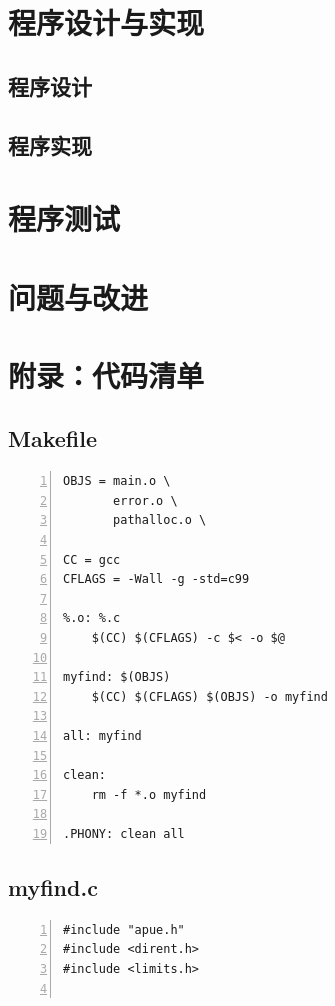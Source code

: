 \documentclass[a4paper,twoside]{article}
\begin{document}
\begin{spacing}{1.2}
\section{程序设计与实现}

\subsection{程序设计}

\subsection{程序实现}

\section{程序测试}

\section{问题与改进}

\appendix
\clearpage
\section*{附录：代码清单}
\label{sec:code}

\subsection{Makefile}

\begin{lstlisting}[numbers=left,style=MakefileStyle,caption=Makefile,label={code:makefile}]
OBJS = main.o \
	   error.o \
	   pathalloc.o \

CC = gcc
CFLAGS = -Wall -g -std=c99

%.o: %.c
	$(CC) $(CFLAGS) -c $< -o $@

myfind: $(OBJS)
	$(CC) $(CFLAGS) $(OBJS) -o myfind

all: myfind

clean:
	rm -f *.o myfind

.PHONY: clean all
\end{lstlisting}

\subsection{myfind.c}

\begin{lstlisting}[numbers=left,style=CppStyle,caption=程序实现,label={code:impl}]
#include "apue.h"
#include <dirent.h>
#include <limits.h>


\end{lstlisting}
\end{spacing}
\end{document}
